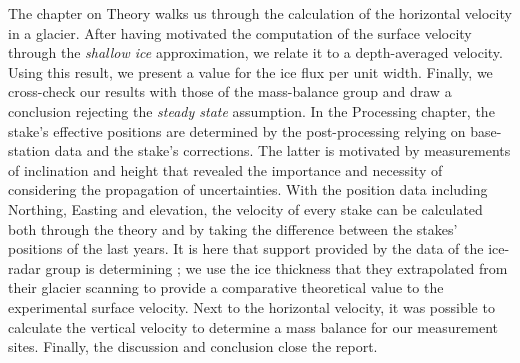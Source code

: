 The chapter on Theory walks us through the calculation of the horizontal velocity in a glacier. After having motivated the computation of the surface velocity through the \textit{shallow ice} approximation, we relate it to a depth-averaged velocity. Using this result, we present a value for the ice flux per unit width. Finally, we cross-check our results with those of the mass-balance group and draw a conclusion rejecting the \textit{steady state} assumption.
In the Processing chapter, the stake's effective positions are determined by the post-processing relying on base-station data and the stake's corrections. The latter is motivated by measurements of inclination and height that revealed the importance and necessity of considering the propagation of uncertainties.
With the position data including Northing, Easting and elevation, the velocity of every stake can be calculated both through the theory and by taking the difference between the stakes' positions of the last years. It is here that support provided by the data of the ice-radar group is determining ; we use the ice thickness that they extrapolated from their glacier scanning to provide a comparative theoretical value to the experimental surface velocity.
Next to the horizontal velocity, it was possible to calculate the vertical velocity to determine a mass balance for our measurement sites. 
Finally, the discussion and conclusion close the report.